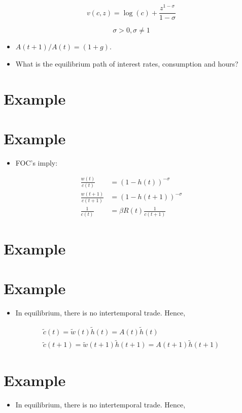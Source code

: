 \documentclass[10pt]{article}
\begin{document}
$$
v(c, z)=\log (c)+\frac{z^{1-\sigma}}{1-\sigma}
$$

$$
\sigma>0, \sigma \neq 1
$$

\begin{itemize}
  \item $A(t+1) / A(t)=(1+g)$.
  \item What is the equilibrium path of interest rates, consumption and hours?
\end{itemize}

\section*{Example}
\section*{Example}
\begin{itemize}
  \item FOC's imply:
\end{itemize}

$$
\begin{aligned}
\frac{w(t)}{c(t)} & =(1-h(t))^{-\sigma} \\
\frac{w(t+1)}{c(t+1)} & =(1-h(t+1))^{-\sigma} \\
\frac{1}{c(t)} & =\beta R(t) \frac{1}{c(t+1)}
\end{aligned}
$$

\section*{Example}
\section*{Example}
\begin{itemize}
  \item In equilibrium, there is no intertemporal trade. Hence,
\end{itemize}

$$
\begin{gathered}
\tilde{c}(t)=\tilde{w}(t) \tilde{h}(t)=A(t) \tilde{h}(t) \\
\tilde{c}(t+1)=\tilde{w}(t+1) \tilde{h}(t+1)=A(t+1) \tilde{h}(t+1)
\end{gathered}
$$

\section*{Example}
\begin{itemize}
  \item In equilibrium, there is no intertemporal trade. Hence,
\end{itemize}
\end{document}
